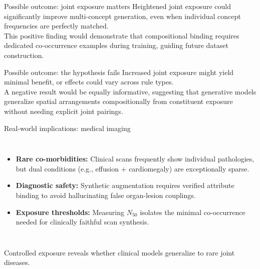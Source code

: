 \documentclass[aspectratio=169,11pt]{beamer}
\newcommand{\captionnote}[1]{{\scriptsize\color{gray}#1}}
\begin{document}
\begin{frame}{Possible outcome: joint exposure matters}
\large Heightened joint exposure could significantly improve multi-concept generation, even when individual concept frequencies are perfectly matched.
\vspace{4mm}\\
\normalsize This positive finding would demonstrate that compositional binding requires dedicated co-occurrence examples during training, guiding future dataset construction.
\end{frame}

\begin{frame}{Possible outcome: the hypothesis fails}
\large Increased joint exposure might yield minimal benefit, or effects could vary across rule types.
\vspace{4mm}\\
\normalsize A negative result would be equally informative, suggesting that generative models generalize spatial arrangements compositionally from constituent exposure without needing explicit joint pairings.
\end{frame}

\begin{frame}{Real-world implications: medical imaging}
\begin{columns}[T]
\begin{itemize}
\item \textbf{Rare co-morbidities:} Clinical scans frequently show individual pathologies, but dual conditions (e.g., effusion + cardiomegaly) are exceptionally sparse.
\item \textbf{Diagnostic safety:} Synthetic augmentation requires verified attribute binding to avoid hallucinating false organ-lesion couplings.
\item \textbf{Exposure thresholds:} Measuring $N_{50}$ isolates the minimal co-occurrence needed for clinically faithful scan synthesis.
\end{itemize}
\centering
\vspace{1mm}
\end{columns}
\vspace{3mm}
\captionnote{Controlled exposure reveals whether clinical models generalize to rare joint diseases.}
\end{frame}
\end{document}
